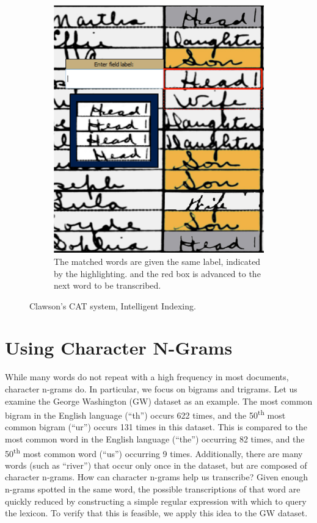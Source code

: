\documentclass[conference]{IEEEtran}
\begin{document}
\begin{figure}
\begin{subfigure}[t]{0.23\textwidth}
    		\includegraphics[width=\textwidth]{ii_ex_new_b}
    		\caption{The matched words are given the same label, indicated by the highlighting.
    		 and the red box is advanced to the next word to be transcribed.}
    	\end{subfigure}
    	\caption{Clawson's CAT system, Intelligent Indexing.
    	}
    	\label{fig:ii}
\end{figure}

\section{Using Character N-Grams}
While many words do not repeat with a high frequency in most documents, character n-grams do. In particular, we focus on bigrams and trigrams. Let us examine the George Washington (GW) dataset \cite{GW} as an example. The most common bigram in the English language (``th'') occurs 622 times, and the 50\textsuperscript{th} most common bigram (``ur'') occurs 131 times in this dataset. This is compared to the most common word in the English language (``the'') occurring 82 times, and the 50\textsuperscript{th} most common word (``us'') occurring 9 times. Additionally, there are many words (such as ``river'') that occur only once in the dataset, but are composed of character n-grams. How can character n-grams help us transcribe? Given enough n-grams spotted in the same word, the possible transcriptions of that word are quickly reduced by constructing a simple regular expression with which to query the lexicon. To verify that this is feasible, we apply this idea to the GW dataset.
\end{document}
